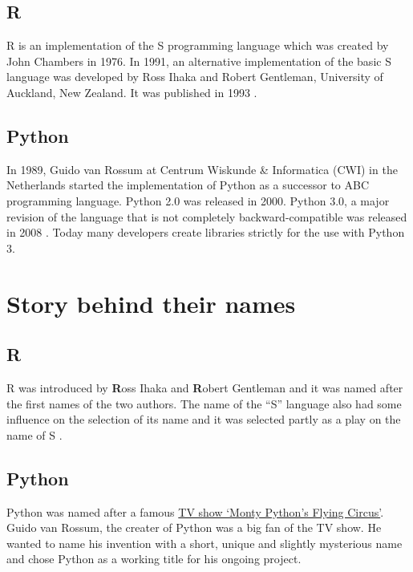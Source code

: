 \documentclass[]{book}
\begin{document}
\hypertarget{r-1}{%
\subsection{R}\label{r-1}}

R is an implementation of the S programming language which was created by John Chambers in 1976. In 1991, an alternative implementation of the basic S language was developed by Ross Ihaka and Robert Gentleman, University of Auckland, New Zealand. It was published in 1993 \citep{wikiR}.

\hypertarget{python-1}{%
\subsection{Python}\label{python-1}}

In 1989, Guido van Rossum at Centrum Wiskunde \& Informatica (CWI) in the Netherlands started the implementation of Python as a successor to ABC programming language. Python 2.0 was released in 2000. Python 3.0, a major revision of the language that is not completely backward-compatible was released in 2008 \citep{wikipython} . Today many developers create libraries strictly for the use with Python 3.

\hypertarget{story-behind-their-names}{%
\section{Story behind their names}\label{story-behind-their-names}}

\hypertarget{r-2}{%
\subsection{R}\label{r-2}}

R was introduced by \textbf{R}oss Ihaka and \textbf{R}obert Gentleman and it was named after the first names of the two authors. The name of the ``S'' language also had some influence on the selection of its name and it was selected partly as a play on the name of S \citep{wikiR}.

\hypertarget{python-2}{%
\subsection{Python}\label{python-2}}

Python was named after a famous \href{https://en.wikipedia.org/wiki/Monty_Python\%27s_Flying_Circus}{TV show `Monty Python's Flying Circus'}. Guido van Rossum, the creater of Python was a big fan of the TV show. He wanted to name his invention with a short, unique and slightly mysterious name and chose Python as a working title for his ongoing project.
\end{document}
